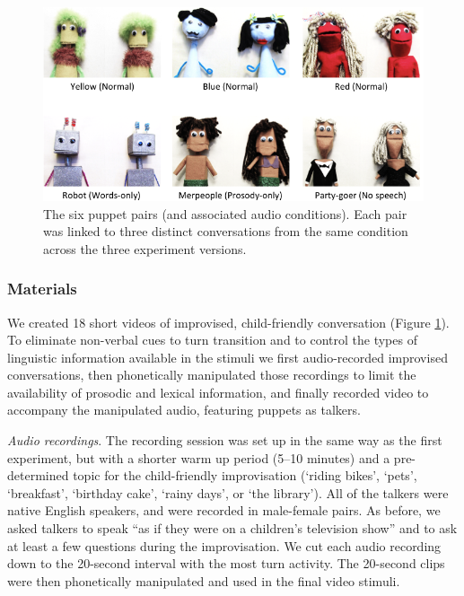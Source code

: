 \documentclass[authoryear, 12pt]{elsarticle}
\begin{document}
\begin{figure}[t]
\begin{center}
\includegraphics[width=\textwidth]{figures/FIG-EN-stim.png}
\end{center}
\caption{The six puppet pairs (and associated audio conditions). Each pair was linked to three distinct conversations from the same condition across the three experiment versions.}
\label{fig:puppets}
\end{figure}

\subsubsection{Materials}
We created 18 short videos of improvised, child-friendly conversation (Figure \ref{fig:puppets}). To eliminate non-verbal cues to turn transition and to control the types of linguistic information available in the stimuli we first audio-recorded improvised conversations, then phonetically manipulated those recordings to limit the availability of prosodic and lexical information, and finally recorded video to accompany the manipulated audio, featuring puppets as talkers. 

\textit{Audio recordings}. The recording session was set up in the same way as the first experiment, but with a shorter warm up period (5--10 minutes) and a pre-determined topic for the child-friendly improvisation (`riding bikes', `pets', `breakfast', `birthday cake', `rainy days', or `the library'). All of the talkers were native English speakers, and were recorded in male-female pairs. As before, we asked talkers to speak ``as if they were on a children's television show'' and to ask at least a few questions during the improvisation. We cut each audio recording down to the 20-second interval with the most turn activity. The 20-second clips were then phonetically manipulated and used in the final video stimuli.
\end{document}

